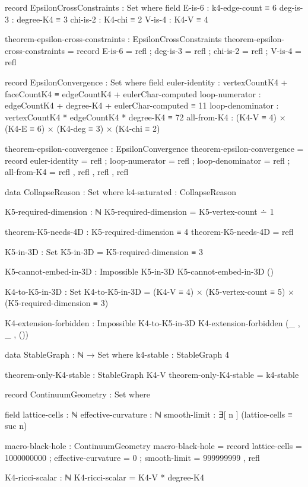 \documentclass[11pt,a4paper]{book}
\begin{document}
\begin{code}
record EpsilonCrossConstraints : Set where
  field
    E-is-6 : k4-edge-count ≡ 6
    deg-is-3 : degree-K4 ≡ 3
    chi-is-2 : K4-chi ≡ 2
    V-is-4 : K4-V ≡ 4

theorem-epsilon-cross-constraints : EpsilonCrossConstraints
theorem-epsilon-cross-constraints = record
  { E-is-6 = refl
  ; deg-is-3 = refl
  ; chi-is-2 = refl
  ; V-is-4 = refl
  }

record EpsilonConvergence : Set where
  field
    euler-identity : vertexCountK4 + faceCountK4 ≡ edgeCountK4 + eulerChar-computed
    loop-numerator : edgeCountK4 + degree-K4 + eulerChar-computed ≡ 11
    loop-denominator : vertexCountK4 * edgeCountK4 * degree-K4 ≡ 72
    all-from-K4 : (K4-V ≡ 4) × (K4-E ≡ 6) × (K4-deg ≡ 3) × (K4-chi ≡ 2)

theorem-epsilon-convergence : EpsilonConvergence
theorem-epsilon-convergence = record
  { euler-identity = refl
  ; loop-numerator = refl
  ; loop-denominator = refl
  ; all-from-K4 = refl , refl , refl , refl
  }

data CollapseReason : Set where
  k4-saturated : CollapseReason

K5-required-dimension : ℕ
K5-required-dimension = K5-vertex-count ∸ 1

theorem-K5-needs-4D : K5-required-dimension ≡ 4
theorem-K5-needs-4D = refl

K5-in-3D : Set
K5-in-3D = K5-required-dimension ≡ 3

K5-cannot-embed-in-3D : Impossible K5-in-3D
K5-cannot-embed-in-3D ()

K4-to-K5-in-3D : Set
K4-to-K5-in-3D = (K4-V ≡ 4) × (K5-vertex-count ≡ 5) × (K5-required-dimension ≡ 3)

K4-extension-forbidden : Impossible K4-to-K5-in-3D
K4-extension-forbidden (_ , _ , ())

data StableGraph : ℕ → Set where
  k4-stable : StableGraph 4

theorem-only-K4-stable : StableGraph K4-V
theorem-only-K4-stable = k4-stable

record ContinuumGeometry : Set where

  field
    lattice-cells : ℕ
    effective-curvature : ℕ
    smooth-limit : ∃[ n ] (lattice-cells ≡ suc n)

macro-black-hole : ContinuumGeometry
macro-black-hole = record
  { lattice-cells = 1000000000
  ; effective-curvature = 0
  ; smooth-limit = 999999999 , refl
  }

K4-ricci-scalar : ℕ
K4-ricci-scalar = K4-V * degree-K4



\end{code}
\end{document}
